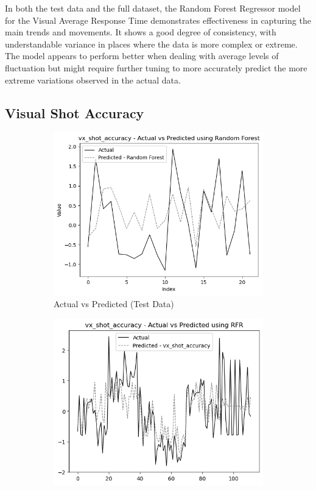 In both the test data and the full dataset, the Random Forest Regressor model for the Visual Average Response Time demonstrates effectiveness in capturing the main trends and movements.
It shows a good degree of consistency, with understandable variance in places where the data is more complex or extreme. The model appears to perform better when dealing with average levels of
fluctuation but might require further tuning to more accurately predict the more extreme variations observed in the actual data.


\subsection*{Visual Shot Accuracy}

\begin{figure}[htbp]
    \centering
    \begin{subfigure}[b]{0.49\textwidth}
        \centering
        \includegraphics[width=\textwidth]{images/test_data_visual_shot_accuracy.png}
        \caption{Actual vs Predicted (Test Data)}
        \label{fig:actual_vs_predicted_vx_shot_accuracy_test}
    \end{subfigure}\hfill
    \begin{subfigure}[b]{0.49\textwidth}
        \centering
        \includegraphics[width=\textwidth]{images/all_data_visual_shot_accuracy.png}

\end{subfigure}
\end{figure}
